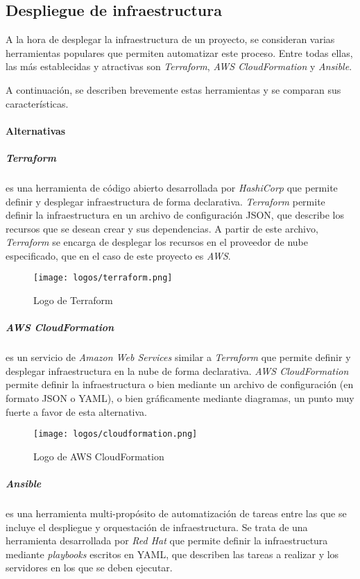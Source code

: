\newpage{}
\subsection{Despliegue de infraestructura}\label{subsec:alt_despliegue}
A la hora de desplegar la infraestructura de un proyecto, se consideran varias
herramientas populares que permiten automatizar este proceso. Entre todas ellas,
las más establecidas y atractivas son \textit{Terraform},
\textit{AWS CloudFormation} y \textit{Ansible}.

A continuación, se describen brevemente estas herramientas y se comparan sus
características.

\paragraph{Alternativas}
\subparagraph{Terraform} es una herramienta de código abierto desarrollada por
\textit{HashiCorp} que permite definir y desplegar infraestructura de forma
declarativa. \textit{Terraform} permite definir la infraestructura en un archivo
de configuración JSON, que describe los recursos que se desean crear y sus
dependencias. A partir de este archivo, \textit{Terraform} se encarga de
desplegar los recursos en el proveedor de nube especificado, que en el caso de
este proyecto es \textit{AWS}.

\begin{figure}[H]
	\centering
	\texttt{[image: logos/terraform.png]}
	\caption{Logo de Terraform~\textregistered}
	\label{fig:terraform}
\end{figure}

\subparagraph{AWS CloudFormation} es un servicio de \textit{Amazon Web Services}
similar a \textit{Terraform} que permite definir y desplegar infraestructura en
la nube de forma declarativa. \textit{AWS CloudFormation} permite definir la
infraestructura o bien mediante un archivo de configuración (en formato JSON o
YAML), o bien gráficamente mediante diagramas, un punto muy fuerte a favor de
esta alternativa.

\begin{figure}[H]
	\centering
	\texttt{[image: logos/cloudformation.png]}
	\caption{Logo de AWS CloudFormation~\textregistered}
	\label{fig:cloudformation}
\end{figure}

\subparagraph{Ansible} es una herramienta multi-propósito de automatización de tareas
entre las que se incluye el despliegue y orquestación de infraestructura. Se
trata de una herramienta desarrollada por \textit{Red Hat} que permite definir
la infraestructura mediante \textit{playbooks} escritos en YAML, que describen
las tareas a realizar y los servidores en los que se deben ejecutar.


